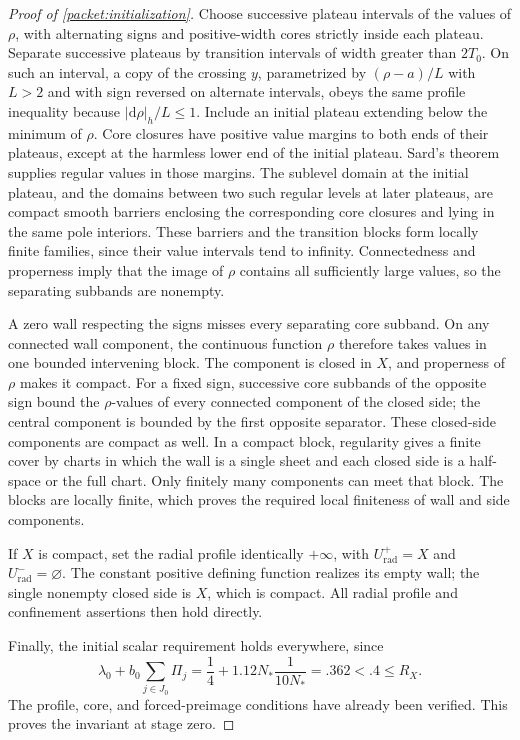 \documentclass[11pt]{article}
\numberwithin{equation}{section}
\theoremstyle{definition}
\theoremstyle{remark}
\begin{document}
\begin{proof}[Proof of \cref{packet:initialization}]
Choose successive plateau intervals of the values of $\rho$, with
alternating signs and positive-width cores strictly inside each
plateau.  Separate successive plateaus by transition intervals of
width greater than $2T_0$.  On such an interval, a copy of the crossing
$y$, parametrized by $(\rho-a)/L$ with $L>2$ and with sign reversed
on alternate intervals, obeys the same profile inequality because
$|\mathrm d\rho|_h/L\le1$.  Include an initial plateau extending below the
minimum of $\rho$.  Core closures have positive value margins to
both ends of their plateaus, except at the harmless lower end of the
initial plateau.  Sard's theorem supplies regular values in those
margins.  The sublevel domain at the initial plateau, and the domains
between two such regular levels at later plateaus, are compact smooth
barriers enclosing the corresponding core closures and lying in the
same pole interiors.  These barriers and the transition blocks form
locally finite families, since their value intervals tend to infinity.
Connectedness and properness imply that the image of $\rho$ contains
all sufficiently large values, so the separating subbands are nonempty.

A zero wall respecting the signs misses every separating core
subband.  On any connected wall component, the continuous function
$\rho$ therefore takes values in one bounded intervening block.
The component is closed in $X$, and properness of $\rho$ makes it
compact.  For a fixed sign, successive core subbands of the opposite
sign bound the $\rho$-values of every connected component of the
closed side; the central component is bounded by the first opposite
separator.  These closed-side components are compact as well.
In a compact block, regularity gives a finite cover by charts in
which the wall is a single sheet and each closed side is a half-space
or the full chart.  Only finitely many components can meet that block.
The blocks are locally finite, which proves the required local
finiteness of wall and side components.

If $X$ is compact, set the radial profile identically $+\infty$, with
$U_{\mathrm{rad}}^+=X$ and $U_{\mathrm{rad}}^-=\varnothing$.
The constant positive defining function realizes its empty wall;
the single nonempty closed side is $X$, which is compact.  All radial
profile and confinement assertions then hold directly.

Finally, the initial scalar requirement holds everywhere, since
\[
 \lambda_0+b_0\sum_{j\in J_0}\Pi_j
 =\frac14+1.12N_*\frac{1}{10N_*}
 =.362<.4\le R_X.
\]
The profile, core, and forced-preimage conditions have already been
verified.  This proves the invariant at stage zero.
\end{proof}
\end{document}
